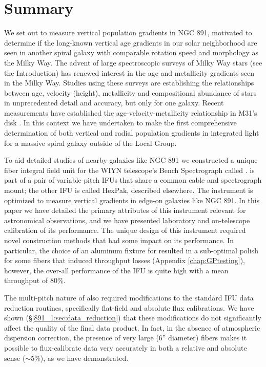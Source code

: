 \section{Summary}
\label{891_1:sec:summary}

We set out to measure vertical population gradients in NGC 891,
motivated to determine if the long-known vertical age gradients in our
solar neighborhood are seen in another spiral galaxy with comparable
rotation speed and morphology as the Milky Way.  The advent of large
spectroscopic surveys of Milky Way stars (see the Introduction) has
renewed interest in the age and metallicity gradients seen in the
Milky Way. Studies using these surveys
\citep[e.g.,][]{Bovy12c,Hayden14,Hayden15} are establishing the
relationships between age, velocity (height), metallicity and
compositional abundance of stars in unprecedented detail and accuracy,
but only for one galaxy.  Recent measurements have established the
age-velocity-metallicity relationship in M31's disk
\citep{Dorman15}. In this context we have undertaken to make the first
comprehensive determination of both vertical and radial population
gradients in integrated light for a massive spiral galaxy outside of
the Local Group.

To aid detailed studies of nearby galaxies like NGC 891 we constructed
a unique fiber integral field unit for the WIYN telescope's Bench
Spectrograph called \GP. \GP is part of a pair of variable-pitch IFUs
that share a common cable and spectrograph mount; the other IFU is
called HexPak, described elsewhere.  The \GP instrument is optimized
to measure vertical gradients in edge-on galaxies like NGC 891. In
this paper we have detailed the primary attributes of this instrument
relevant for astronomical observations, and we have presented
laboratory and on-telescope calibration of its performance.  The
unique design of this instrument required novel construction methods
that had some impact on its performance. In particular, the choice of
an aluminum fixture for \GP resulted in a sub-optimal polish for some
fibers that induced throughput losses (Appendix \ref{chap:GPtesting}),
however, the over-all performance of the IFU is quite high with a mean
throughput of 80\%.

The multi-pitch nature of \GP also required modifications to the
standard IFU data reduction routines, specifically flat-field and
absolute flux calibrations. We have shown (\S\ref{891_1:sec:data_reduction})
that these modifications do not significantly affect the quality of
the final data product. In fact, in the absence of atmospheric
dispersion correction, the presence of very large (6'' diameter)
fibers makes it possible to flux-calibrate \GP data very accurately in
both a relative and absolute sense ($\sim$5\%), as we have
demonstrated.

